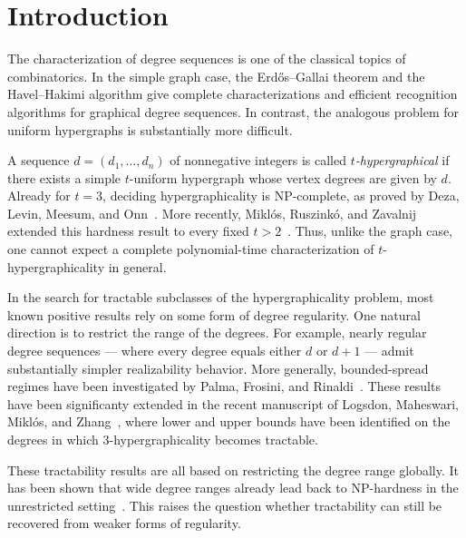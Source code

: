 \documentclass[pdflatex,sn-mathphys-num]{sn-jnl}%
\theoremstyle{thmstyleone}%
\theoremstyle{thmstyletwo}%
\theoremstyle{thmstylethree}%
\begin{document}

\maketitle

\section{Introduction}\label{sec1}

The characterization of degree sequences is one of the classical topics of combinatorics. In the simple graph case, the Erd\H{o}s--Gallai theorem \cite{ErdosGallai} and the Havel--Hakimi algorithm \cite{Hakimi,Havel} give complete characterizations and efficient recognition algorithms for graphical degree sequences. In contrast, the analogous problem for uniform hypergraphs is substantially more difficult.

A sequence $d=(d_1,\dots,d_n)$ of nonnegative integers is called \emph{$t$-hypergraphical} if there exists a simple $t$-uniform hypergraph whose vertex degrees are given by $d$. Already for $t=3$, deciding hypergraphicality is NP-complete, as proved by Deza, Levin, Meesum, and Onn~\cite{Deza}. More recently, Mikl\'os, Ruszink\'o, and Zavalnij extended this hardness result to every fixed $t>2$~\cite{MRZ}. Thus, unlike the graph case, one cannot expect a complete polynomial-time characterization of $t$-hypergraphicality in general.

In the search for tractable subclasses of the hypergraphicality problem, most known positive results rely on some form of degree regularity. One natural direction is to restrict the range of the degrees. For example, nearly regular degree sequences --- where every degree equals either $d$ or $d+1$ --- admit substantially simpler realizability behavior. More generally, bounded-spread regimes have been investigated by Palma, Frosini, and Rinaldi~\cite{PFR}.
These results have been significanty extended in the recent manuscript of Logsdon, Maheswari, Mikl\'os, and Zhang~\cite{LMMZ}, where lower and upper bounds have been identified on the degrees in which $3$-hypergraphicality becomes tractable.

These tractability results are all based on restricting the degree range globally. It has been shown that wide degree ranges already lead back to NP-hardness in the unrestricted setting~\cite{LMMZ}. This raises the question whether tractability can still be recovered from weaker forms of regularity.
\end{document}
